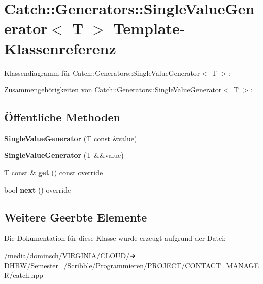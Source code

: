 \hypertarget{classCatch_1_1Generators_1_1SingleValueGenerator}{}\section{Catch\+:\+:Generators\+:\+:Single\+Value\+Generator$<$ T $>$ Template-\/\+Klassenreferenz}
\label{classCatch_1_1Generators_1_1SingleValueGenerator}


Klassendiagramm für Catch\+:\+:Generators\+:\+:Single\+Value\+Generator$<$ T $>$\+:


Zusammengehörigkeiten von Catch\+:\+:Generators\+:\+:Single\+Value\+Generator$<$ T $>$\+:
\subsection*{Öffentliche Methoden}
\begin{DoxyCompactItemize}
\item 
\mbox{\label{classCatch_1_1Generators_1_1SingleValueGenerator_a4bed2ad14ffe04102d8135e2c82b3ace}} 
{\bfseries Single\+Value\+Generator} (T const \&value)
\item 
\mbox{\label{classCatch_1_1Generators_1_1SingleValueGenerator_a532140dd2d1a673692271bb76a661ebe}} 
{\bfseries Single\+Value\+Generator} (T \&\&value)
\item 
\mbox{\label{classCatch_1_1Generators_1_1SingleValueGenerator_a5142058c52131a2471e7307972f99b50}} 
T const  \& {\bfseries get} () const override
\item 
\mbox{\label{classCatch_1_1Generators_1_1SingleValueGenerator_a10833b34e3ccbc484624185712eb8b6e}} 
bool {\bfseries next} () override
\end{DoxyCompactItemize}
\subsection*{Weitere Geerbte Elemente}


Die Dokumentation für diese Klasse wurde erzeugt aufgrund der Datei\+:\begin{DoxyCompactItemize}
\item 
/media/dominsch/\+V\+I\+R\+G\+I\+N\+I\+A/\+C\+L\+O\+U\+D/➔ D\+H\+B\+W/\+Semester\+\_/\+Scribble/\+Programmieren/\+P\+R\+O\+J\+E\+C\+T/\+C\+O\+N\+T\+A\+C\+T\+\_\+\+M\+A\+N\+A\+G\+E\+R/catch.\+hpp\end{DoxyCompactItemize}
